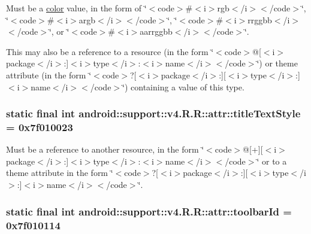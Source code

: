 Must be a \hyperlink{classandroid_1_1support_1_1v4_1_1_r_1_1color}{color} value, in the form of \char`\"{}$<$code$>$\#$<$i$>$rgb$<$/i$>$$<$/code$>$\char`\"{}, \char`\"{}$<$code$>$\#$<$i$>$argb$<$/i$>$$<$/code$>$\char`\"{}, \char`\"{}$<$code$>$\#$<$i$>$rrggbb$<$/i$>$$<$/code$>$\char`\"{}, or \char`\"{}$<$code$>$\#$<$i$>$aarrggbb$<$/i$>$$<$/code$>$\char`\"{}. 

This may also be a reference to a resource (in the form \char`\"{}$<$code$>$@\mbox{[}$<$i$>$package$<$/i$>$:\mbox{]}$<$i$>$type$<$/i$>$:$<$i$>$name$<$/i$>$$<$/code$>$\char`\"{}) or theme attribute (in the form \char`\"{}$<$code$>$?\mbox{[}$<$i$>$package$<$/i$>$:\mbox{]}\mbox{[}$<$i$>$type$<$/i$>$:\mbox{]}$<$i$>$name$<$/i$>$$<$/code$>$\char`\"{}) containing a value of this type. \hypertarget{classandroid_1_1support_1_1v4_1_1_r_1_1attr_c7ed41fc8bae383500307a9d918037c5}{
\subsubsection[{titleTextStyle}]{\setlength{\rightskip}{0pt plus 5cm}static final int android::support::v4.R.R::attr::titleTextStyle = 0x7f010023}}
\label{classandroid_1_1support_1_1v4_1_1_r_1_1attr_c7ed41fc8bae383500307a9d918037c5}


Must be a reference to another resource, in the form \char`\"{}$<$code$>$@\mbox{[}+\mbox{]}\mbox{[}$<$i$>$package$<$/i$>$:\mbox{]}$<$i$>$type$<$/i$>$:$<$i$>$name$<$/i$>$$<$/code$>$\char`\"{} or to a theme attribute in the form \char`\"{}$<$code$>$?\mbox{[}$<$i$>$package$<$/i$>$:\mbox{]}\mbox{[}$<$i$>$type$<$/i$>$:\mbox{]}$<$i$>$name$<$/i$>$$<$/code$>$\char`\"{}. \hypertarget{classandroid_1_1support_1_1v4_1_1_r_1_1attr_cad410b4f6328a475553f5c45c13bdaf}{
\subsubsection[{toolbarId}]{\setlength{\rightskip}{0pt plus 5cm}static final int android::support::v4.R.R::attr::toolbarId = 0x7f010114}}
\label{classandroid_1_1support_1_1v4_1_1_r_1_1attr_cad410b4f6328a475553f5c45c13bdaf}


